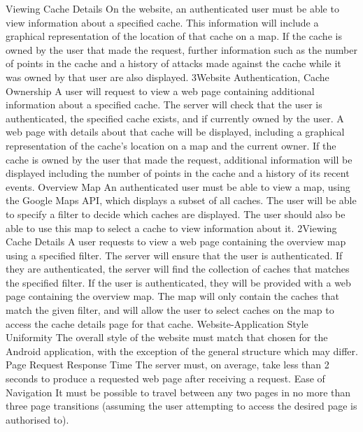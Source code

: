 			{Viewing Cache Details}
			{On the website, an authenticated user must be able to view
			information about a specified cache. This information will include
			a graphical representation of the location of that cache on a map.
			If the cache is owned by the user that made the request, further
			information such as the number of points in the cache and a history 
			of attacks made against the cache while it was owned by that user
			are also displayed.}
			{3}{Website Authentication, Cache Ownership}
			{A user will request to view a web page containing additional
			information about a specified cache.}
			{The server will check that the user is authenticated, the
			specified cache	exists, and if currently owned by the user.}
			{A web page with details about that cache will be displayed,
			including a graphical representation of the cache's location on a
			map and the current owner. If the cache is owned by the user that
			made the request, additional information will be displayed
			including the number of points in the cache and a history of its
			recent events.}
		\funcreq %
			{Overview Map}
			{An authenticated user must be able to view a map, using the Google
			Maps API, which displays a subset of all caches. The user will be
			able to specify a filter to decide which caches are displayed. The
			user should also be able to use this map to select a cache to view
			information about it.}
			{2}{Viewing Cache Details}
			{A user requests to view a web page containing the overview map
			using a specified filter.}
			{The server will ensure that the user is authenticated. If they are
			authenticated, the server will find the collection of caches that
			matches the specified filter.}
			{If the user is authenticated, they will be provided with a web 
			page containing the overview map. The map will only contain the
			caches that match the given filter, and will allow the user to
			select caches on the map to access the cache details page for that
			cache.}
		\nonfuncreq %
			{Website-Application Style Uniformity}
			{The overall style of the website must match that chosen for the
			Android application, with the exception of the general structure
			which may differ.}
		\nonfuncreq %
			{Page Request Response Time}
			{The server must, on average, take less than 2 seconds to produce
			a requested web page after receiving a request.}
		\nonfuncreq %
			{Ease of Navigation}
			{It must be possible to travel between any two pages in no more
			than three page transitions (assuming the user attempting to
			access the desired page is authorised to).}

\renewcommand{\arraystretch}{1}

